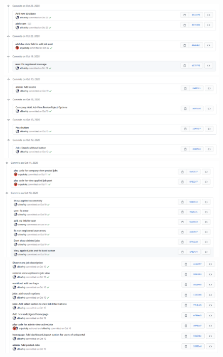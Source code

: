 \documentclass[a4paper,12pt]{report}
\begin{document}
\begin{figure}[bph]
	\centering
	\includegraphics[width=.8\linewidth]{img/screenshots/git/6}
	\includegraphics[width=.8\linewidth]{img/screenshots/git/7}
	\includegraphics[width=.8\linewidth]{img/screenshots/git/8}
	\includegraphics[width=.8\linewidth]{img/screenshots/git/9}
\end{figure}
\end{document}
